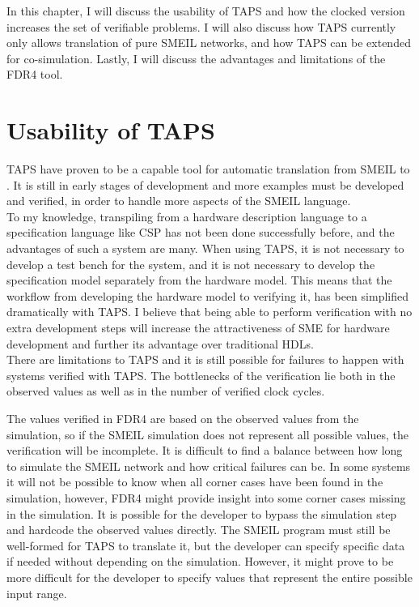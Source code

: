 In this chapter, I will discuss the usability of TAPS and how the clocked version increases the set of verifiable problems. I will also discuss how TAPS currently only allows translation of pure SMEIL networks, and how TAPS can be extended for co-simulation. Lastly, I will discuss the advantages and limitations of the FDR4 tool.
\section{Usability of TAPS}
TAPS have proven to be a capable tool for automatic translation from SMEIL to \cspm{}. It is still in early stages of development and more examples must be developed and verified, in order to handle more aspects of the SMEIL language.\\

To my knowledge, transpiling from a hardware description language to a specification language like CSP has not been done successfully before, and the advantages of such a system are many. When using TAPS, it is not necessary to develop a test bench for the system, and it is not necessary to develop the specification model separately from the hardware model. This means that the workflow from developing the hardware model to verifying it, has been simplified dramatically with TAPS. I believe that being able to perform verification with no extra development steps will increase the attractiveness of SME for hardware development and further its advantage over traditional HDLs.\\

There are limitations to TAPS and it is still possible for failures to happen with systems verified with TAPS. The bottlenecks of the verification lie both in the observed values as well as in the number of verified clock cycles.

The values verified in FDR4 are based on the observed values from the simulation, so if the SMEIL simulation does not represent all possible values, the verification will be incomplete.
It is difficult to find a balance between how long to simulate the SMEIL network and how critical failures can be. In some systems it will not be possible to know when all corner cases have been found in the simulation, however, FDR4 might provide insight into some corner cases missing in the simulation.
It is possible for the developer to bypass the simulation step and hardcode the observed values directly. The SMEIL program must still be well-formed for TAPS to translate it, but the developer can specify specific data if needed without depending on the simulation. However, it might prove to be more difficult for the developer to specify values that represent the entire possible input range.\\

